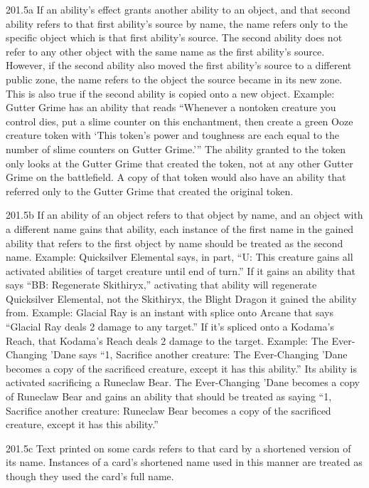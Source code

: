 201.5a If an ability’s effect grants another ability to an object, and that second ability refers to that first ability’s source by name, the name refers only to the specific object which is that first ability’s source. The second ability does not refer to any other object with the same name as the first ability’s source. However, if the second ability also moved the first ability’s source to a different public zone, the name refers to the object the source became in its new zone. This is also true if the second ability is copied onto a new object.
Example: Gutter Grime has an ability that reads “Whenever a nontoken creature you control dies, put a slime counter on this enchantment, then create a green Ooze creature token with ‘This token’s power and toughness are each equal to the number of slime counters on Gutter Grime.’” The ability granted to the token only looks at the Gutter Grime that created the token, not at any other Gutter Grime on the battlefield. A copy of that token would also have an ability that referred only to the Gutter Grime that created the original token.

201.5b If an ability of an object refers to that object by name, and an object with a different name gains that ability, each instance of the first name in the gained ability that refers to the first object by name should be treated as the second name.
Example: Quicksilver Elemental says, in part, “{U}: This creature gains all activated abilities of target creature until end of turn.” If it gains an ability that says “{BB}: Regenerate Skithiryx,” activating that ability will regenerate Quicksilver Elemental, not the Skithiryx, the Blight Dragon it gained the ability from.
Example: Glacial Ray is an instant with splice onto Arcane that says “Glacial Ray deals 2 damage to any target.” If it’s spliced onto a Kodama’s Reach, that Kodama’s Reach deals 2 damage to the target.
Example: The Ever-Changing ’Dane says “{1}, Sacrifice another creature: The Ever-Changing ’Dane becomes a copy of the sacrificed creature, except it has this ability.” Its ability is activated sacrificing a Runeclaw Bear. The Ever-Changing ’Dane becomes a copy of Runeclaw Bear and gains an ability that should be treated as saying “{1}, Sacrifice another creature: Runeclaw Bear becomes a copy of the sacrificed creature, except it has this ability.”

201.5c Text printed on some cards refers to that card by a shortened version of its name. Instances of a card’s shortened name used in this manner are treated as though they used the card’s full name.

